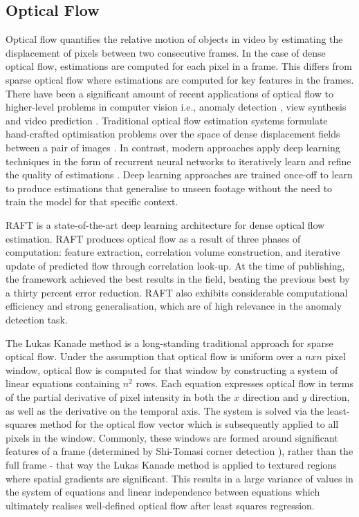 \documentclass[sigplan,authorversion,nonacm, 9pt]{acmart}
\begin{document}
\subsection{Optical Flow}
    Optical flow quantifies the relative motion of objects in video by estimating the displacement of pixels between two consecutive frames. In the case of dense optical flow, estimations are computed for each pixel in a frame. This differs from sparse optical flow where estimations are computed for key features in the frames.
    There have been a significant amount of recent applications of optical flow to higher-level problems in computer vision i.e., anomaly detection \cite{futureframepred}, view synthesis \cite{viewsyn} and video prediction \cite{videopred}. 
    Traditional optical flow estimation systems formulate hand-crafted optimisation problems over the space of dense displacement fields between a pair of images \cite{traditionalflow}. In contrast, modern approaches apply deep learning techniques in the form of recurrent neural networks to iteratively learn and refine the quality of estimations \cite{raft} \cite{ren} \cite{flownet}. Deep learning approaches are trained once-off to learn to produce estimations that generalise to unseen footage without the need to train the model for that specific context.
\par
RAFT \cite{raft} is a state-of-the-art deep learning architecture for dense optical flow estimation.
RAFT produces optical flow as a result of three phases of computation: feature extraction, correlation volume construction, and iterative update of predicted flow through correlation look-up. 
At the time of publishing, the framework achieved the best results in the field, beating the previous best by a thirty percent error reduction. RAFT also exhibits considerable computational efficiency and strong generalisation, which are of high relevance in the anomaly detection task.
\par
The Lukas Kanade method  \cite{lukaskanade} is a long-standing traditional approach for sparse optical flow.
Under the assumption that optical flow is uniform over a $n x n$ pixel window, optical flow is computed for that window by constructing a system of linear equations containing $n^2$ rows. Each equation expresses optical flow in terms of the partial derivative of pixel intensity in both the $x$ direction and $y$ direction, as well as the derivative on the temporal axis. The system is solved via the least-squares method for the optical flow vector which is subsequently applied to all pixels in the window.
Commonly, these windows are formed around significant features of a frame (determined by Shi-Tomasi corner detection \cite{shitomasi}), rather than the full frame - that way the Lukas Kanade method is applied to textured regions where spatial gradients are significant. This results in a large variance of values in the system of equations and linear independence between equations which ultimately realises well-defined optical flow after least squares regression. 
\end{document}
